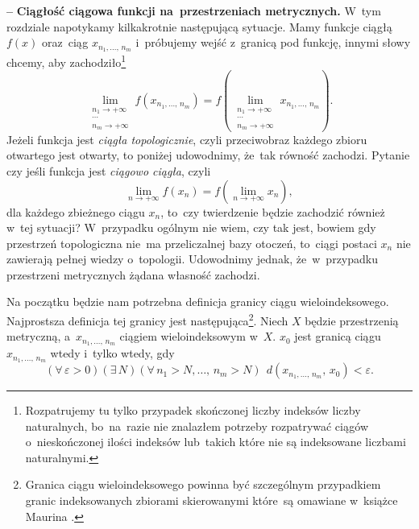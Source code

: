 \documentclass[a4paper,11pt]{article}
\newcommand{\ld}{\ldots}
\newcommand{\ra}{\rightarrow}
\newcommand{\wtw}{wtedy i~tylko wtedy}
\newcommand{\veps}{\varepsilon}
\newcommand{\Lim}{\lim\limits}
\newcommand{\tb}{\textbf}
\newcommand{\noi}{\noindent}
\newcommand{\start}{\noi \tb{--} {}}
\begin{document}
\start \tb{Ciągłość ciągowa funkcji na~przestrzeniach metrycznych.}
W~tym rozdziale napotykamy kilkakrotnie następującą sytuacje. Mamy
funkcje ciągłą $f( x )$ oraz~ciąg $x_{ n_{ 1 }, \ld, \, n_{ m } }$
i~próbujemy wejść z~granicą pod funkcję, innymi słowy chcemy, aby
zachodziło\footnote{Rozpatrujemy tu tylko przypadek skończonej liczby
  indeksów liczby naturalnych, bo~na~razie nie znalazłem potrzeby
  rozpatrywać ciągów o~nieskończonej ilości indeksów lub~takich które
  nie są indeksowane liczbami naturalnymi.}
\begin{equation*}
  \Lim_{ \substack{ n_{ 1 } \ra +\infty \\ \cdots \\  n_{ m } \ra +\infty } }
  f( x_{ n_{ 1 }, \ld, \, n_{ m } } )
  = f( \Lim_{ \substack{ n_{ 1 } \ra +\infty \\ \cdots \\ n_{ m } \ra +\infty } }
  x_{ n_{ 1 }, \ld, \, n_{ m } } ).
\end{equation*}
Jeżeli funkcja jest \emph{ciągła topologicznie}, czyli przeciwobraz
każdego zbioru otwartego jest otwarty, to poniżej udowodnimy, że~tak
równość zachodzi. Pytanie czy jeśli funkcja jest \emph{ciągowo
  ciągła}, czyli
\begin{equation*}
  \Lim_{ n \ra +\infty } f( x_{ n } ) = f( \Lim_{ n \ra +\infty } x_{ n } ),
\end{equation*}
dla każdego zbieżnego ciągu $x_{ n }$, to~czy twierdzenie będzie
zachodzić również w~tej sytuacji? W~przypadku ogólnym nie wiem, czy
tak jest, bowiem gdy przestrzeń topologiczna nie~ma przeliczalnej bazy
otoczeń, to~ciągi postaci $x_{ n }$ nie zawierają pełnej wiedzy
o~topologii. Udowodnimy jednak, że~w~przypadku przestrzeni metrycznych
żądana własność zachodzi.

Na początku będzie nam potrzebna definicja granicy ciągu
wieloindeksowego. Najprostsza definicja tej granicy jest
następująca\footnote{Granica ciągu wieloindeksowego powinna być
  szczególnym przypadkiem granic indeksowanych zbiorami skierowanymi
  które~są omawiane w~książce Maurina \cite{Maurin74}.}. Niech $X$
będzie przestrzenią metryczną, a~$x_{ n_{ 1 }, \ld, \, n_{ m } }$
ciągiem wieloindeksowym w~$X$. $x_{ 0 }$ jest granicą ciągu
$x_{ n_{ 1 }, \ld, \, n_{ m } }$ \wtw, gdy
\begin{displaymath}
  ( \forall \, \veps > 0) ( \exists \, N )
  ( \forall \, n_{ 1 } > N, \ld, \, n_{ m } > N ) \;\,
  d( x_{ n_{ 1 }, \ld, \, n_{ m } }, \, x_{ 0 } ) < \veps.
\end{displaymath}
\end{document}
